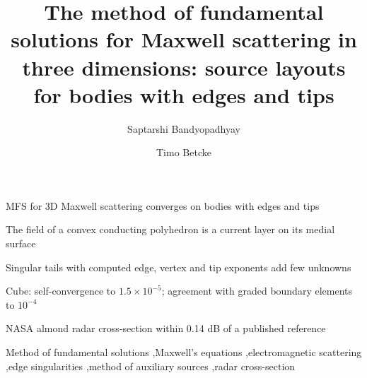 \documentclass[preprint,12pt]{elsarticle}
\begin{document}
\begin{frontmatter}

\title{The method of fundamental solutions for Maxwell scattering in three dimensions: source layouts for bodies with edges and tips}

\author[inst1]{Saptarshi Bandyopadhyay}

\author[inst1]{Timo Betcke}


\begin{abstract}

\end{abstract}

\begin{highlights}
\item MFS for 3D Maxwell scattering converges on bodies with edges and tips
\item The field of a convex conducting polyhedron is a current layer on its medial surface
\item Singular tails with computed edge, vertex and tip exponents add few unknowns
\item Cube: self-convergence to $1.5\times10^{-5}$; agreement with graded boundary elements to $10^{-4}$
\item NASA almond radar cross-section within 0.14 dB of a published reference
\end{highlights}

\begin{keyword}
Method of fundamental solutions \sep Maxwell's equations \sep electromagnetic scattering \sep edge singularities \sep method of auxiliary sources \sep radar cross-section
\end{keyword}

\end{frontmatter}









\end{document}
